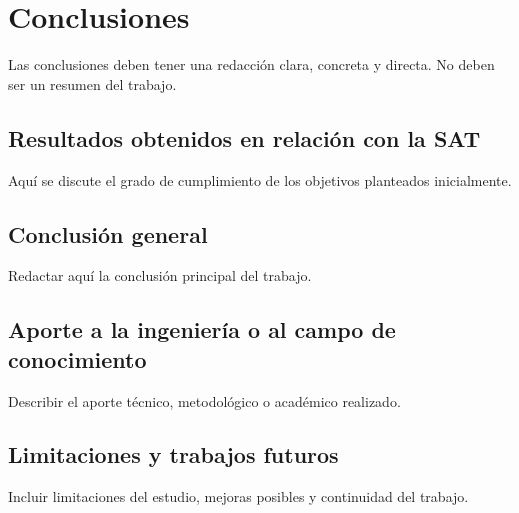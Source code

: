 \chapter*{Conclusiones}

Las conclusiones deben tener una redacción clara, concreta y directa. No deben ser un resumen del trabajo.

\section*{Resultados obtenidos en relación con la SAT}

Aquí se discute el grado de cumplimiento de los objetivos planteados inicialmente.

\section*{Conclusión general}

Redactar aquí la conclusión principal del trabajo.

\section*{Aporte a la ingeniería o al campo de conocimiento}

Describir el aporte técnico, metodológico o académico realizado.

\section*{Limitaciones y trabajos futuros}

Incluir limitaciones del estudio, mejoras posibles y continuidad del trabajo.